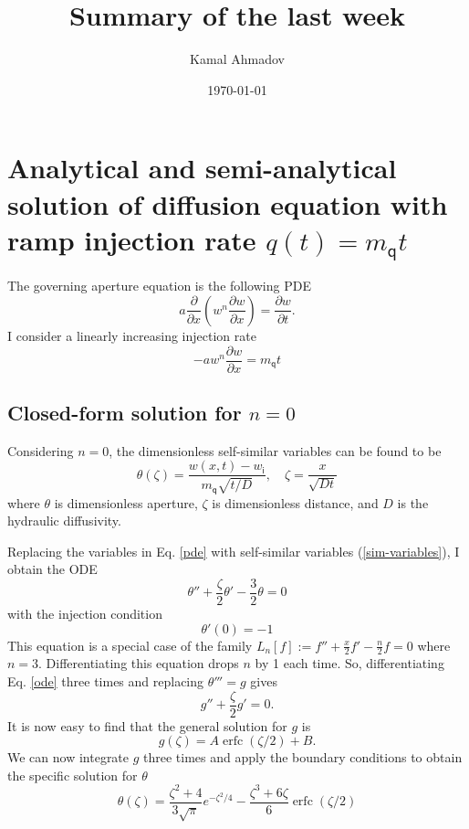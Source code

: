 \documentclass[12pt]{article}
\begin{document}
\title{Summary of the last week}
\author{Kamal Ahmadov}
\date{\today}
\maketitle

\section{Analytical and semi-analytical solution of diffusion equation with ramp injection rate
  $q(t)=m_{\mathsf{q}}t$}

The governing aperture equation is the following PDE
\begin{equation}\label{pde}
	a \frac{ \partial }{ \partial x } \left(w^{n} \frac{ \partial w }{ \partial
		x }  \right)  = \frac{ \partial w }{ \partial t }.
\end{equation}
I consider a linearly increasing injection rate
\begin{equation}
	- a w^n \frac{ \partial w }{ \partial x }  = m_{\mathsf{q}} t
\end{equation}
\subsection{Closed-form solution for $n=0$}
Considering $n=0$, the dimensionless self-similar variables can be found to be
\begin{equation}\label{sim-variables}
	\theta(\zeta) = \frac{w(x,t) - w_{\mathsf{i}}}{m_{\mathsf{q}} \sqrt{ t / D }},
	\quad \zeta = \frac{x}{\sqrt{ D t }}
\end{equation}
where $\theta$ is dimensionless aperture, $\zeta$ is dimensionless
distance, and $D$ is the hydraulic diffusivity.

Replacing the variables in Eq. \ref{pde} with self-similar variables
(\ref{sim-variables}), I obtain the ODE
\begin{equation}\label{ode}
	\theta'' + \frac{\zeta}{2} \theta' - \frac{3}{2} \theta = 0
\end{equation}
with the injection condition
$$
	\theta'(0) = -1
$$
This equation is a special case of the family $L_{n}[f] := f'' + \frac{x}{2} f'
	- \frac{n}{2} f = 0$ where $n=3$. Differentiating this equation drops $n$ by 1
each time. So, differentiating Eq. \ref{ode} three times and replacing $\theta''' =
	g$ gives
$$
	g'' + \frac{\zeta}{2}g' = 0.
$$
It is now easy to find that the general solution for $g$ is
$$
	g(\zeta) = A \operatorname{erfc} (\zeta/2) + B.
$$
We can now integrate $g$ three times and apply the boundary conditions to obtain
the specific solution for $\theta$
\begin{equation}\label{ode-sol}
	\theta(\zeta) = \frac{\zeta^{2} + 4}{3 \sqrt{ \pi }} e^{ - \zeta^{2} / 4 } -
	\frac{\zeta^{3} + 6 \zeta}{6} \operatorname{erfc} (\zeta / 2)
\end{equation}
\end{document}
